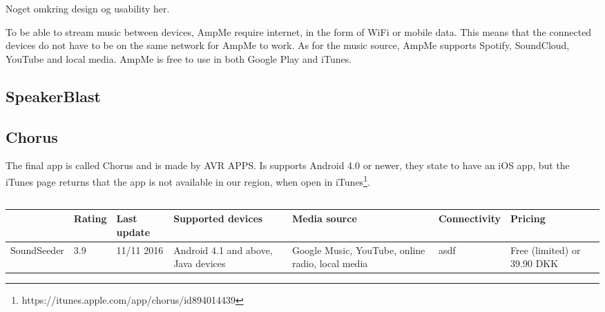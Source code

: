 Noget omkring design og usability her.

To be able to stream music between devices, AmpMe require internet, in the form of WiFi or mobile data.
This means that the connected devices do not have to be on the same network for AmpMe to work. 
As for the music source, AmpMe supports Spotify, SoundCloud, YouTube and local media.
AmpMe is free to use in both Google Play and iTunes.


\iffalse
By Amp Me Inc.
4.2 stars on Google Play, current version, 3.5 stars, all versions 4 stars on iTunes
Functionality / How good it works
30. januar 2017 (Android), Feb 01, 2017 (iOS)
Android and iOS
Spotify, SoundCloud, YouTube and your local music library
Require internet, WiFi/Mobile data
Free
Resync button, syncs upon connection
\fi
\subsection{SpeakerBlast}

\subsection{Chorus}
The final app is called Chorus and is made by AVR APPS.
Is supports Android 4.0 or newer, they state to have an iOS app, but the iTunes page returns that the app is not available in our region,
when open in iTunes\footnote{https://itunes.apple.com/app/chorus/id894014439}.



\iffalse
By AVR APPS 
3.3 stars on Google Play
Functionality / How good it works
11. maj 2015
Android 4.0, iOS
Local media?
Mobile hotspot or WiFi
Free
Manual/automatic sync
\fi
\subsection{}
\iffalse
        Func1 FUnc2 
App1
App2
App3
\fi

\begin{tabular}{l|l|l|p{2.5cm}|p{2.5cm}|p{2.5cm}|p{2.5cm}|}
                & Rating    & Last update   & Supported devices & Media source & Connectivity & Pricing  \\
    \toprule
    SoundSeeder & 3.9       & 11/11 2016    & Android 4.1 and above, Java devices & Google Music, YouTube, online radio, local media & asdf & Free (limited) or 39.90 DKK \\
\end{tabular}

